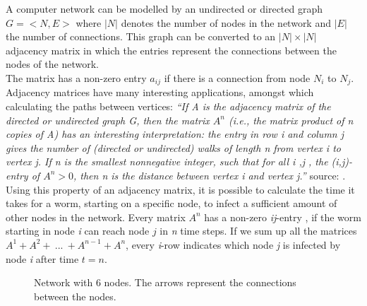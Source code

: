 A computer network can be modelled by an undirected or directed graph $G = < N, E> $ where $|N|$ denotes the number of nodes in the network and $|E|$ the number of connections. This graph can be converted to an  $|N| \times |N|$ adjacency matrix in which the entries represent the connections between the nodes of the network. \\
The matrix has a non-zero entry $a_{ij}$ if there is a connection from node $N_{i}$ to $N_{j}$. \\ 


Adjacency matrices have many interesting applications, amongst which calculating the paths between vertices:
\textit{``If \textit{A} is the adjacency matrix of the directed or undirected graph \textit{G}, then the matrix $A^{n}$ (i.e., the matrix product of \textit{n} copies of \textit{A}) has an interesting interpretation: the entry in row \textit{i} and column \textit{j} gives the number of (directed or undirected) walks of length \textit{n} from vertex \textit{i} to vertex \textit{j}. If \textit{n} is the smallest nonnegative integer, such that for all i ,j , the (i,j)-entry of $A^{n} > 0$, then n is the distance between vertex i and vertex \textit{j}.''}  source: \cite{wikimatrix} .\\
Using this property of an adjacency matrix, it is possible to calculate the time it takes for a worm, starting on a specific node, to infect a sufficient amount of other nodes in the network. Every matrix $A^{n}$ has a non-zero \textit{ij}-entry , if the worm starting in node \textit{i} can reach node $j$ in \textit{n} time steps. If we sum up all the matrices $A^{1} + A^{2} + ~...~+ A^{n-1}+A^{n}$, every \textit{i}-row indicates which node \textit{j} is infected by node \textit{i} after time $t=n$.  

\begin{figure}
\centering
{}
\caption{Network with 6 nodes. The arrows represent the connections between the nodes. }
\label{netwerkfiguur}
\end{figure}

